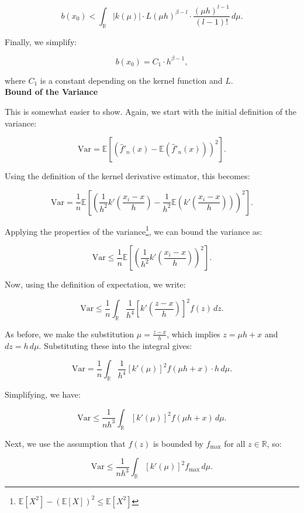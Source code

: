 \documentclass{article}
\begin{document}
\[
b(x_0) < \int_{\mathbb{R}} |k(\mu)| \cdot L (\mu h)^{\beta - l} \cdot \frac{(\mu h)^{l-1}}{(l-1)!} \, d\mu.
\]

Finally, we simplify:

\[
b(x_0) = C_1 \cdot h^{\beta - 1},
\]

where \(C_1\) is a constant depending on the kernel function and \(L\). \\



\textbf{Bound of the Variance}

This is somewhat easier to show. Again, we start with the initial definition of the variance:

\[
\text{Var} = \mathbb{E}\left[\left(\hat{f}'_n(x) - \mathbb{E}(\hat{f}'_n(x))\right)^2\right].
\]

Using the definition of the kernel derivative estimator, this becomes:

\[
\text{Var} = \frac{1}{n} \mathbb{E}\left[\left(\frac{1}{h^2} k'\left(\frac{x_i - x}{h}\right) - \frac{1}{h^2} \mathbb{E}\left(k'\left(\frac{x_i - x}{h}\right)\right)\right)^2\right].
\]

Applying the properties of the variance\footnote{\(\mathbb{E}[X^2] - (\mathbb{E}[X])^2 \leq \mathbb{E}[X^2]\)}, we can bound the variance as:

\[
\text{Var} \leq \frac{1}{n} \mathbb{E}\left[\left(\frac{1}{h^2} k'\left(\frac{x_i - x}{h}\right)\right)^2\right].
\]

Now, using the definition of expectation, we write:

\[
\text{Var} \leq \frac{1}{n} \int_{\mathbb{R}} \frac{1}{h^4} \left[k'\left(\frac{z - x}{h}\right)\right]^2 f(z) \, dz.
\]

As before, we make the substitution \(\mu = \frac{z - x}{h}\), which implies \(z = \mu h + x\) and \(dz = h \, d\mu\). Substituting these into the integral gives:

\[
\text{Var} = \frac{1}{n} \int_{\mathbb{R}} \frac{1}{h^4} \left[k'(\mu)\right]^2 f(\mu h + x) \cdot h \, d\mu.
\]

Simplifying, we have:

\[
\text{Var} \leq \frac{1}{n h^3} \int_{\mathbb{R}} \left[k'(\mu)\right]^2 f(\mu h + x) \, d\mu.
\]

Next, we use the assumption that \(f(z)\) is bounded by \(f_{\text{max}}\) for all \(z \in \mathbb{R}\), so:

\[
\text{Var} \leq \frac{1}{n h^3} \int_{\mathbb{R}} \left[k'(\mu)\right]^2 f_{\text{max}} \, d\mu.
\]
\end{document}
